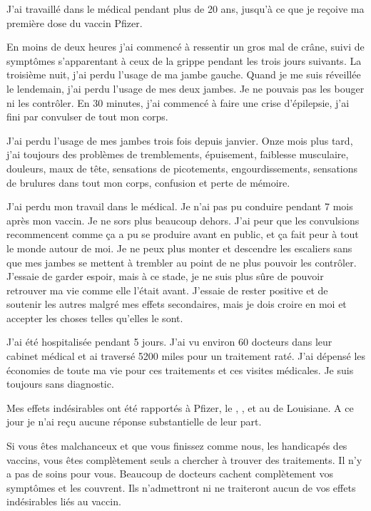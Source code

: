 J'ai travaillé dans le médical pendant plus de 20 ans, jusqu'à ce que je reçoive
ma première dose du vaccin Pfizer.

En moins de deux heures j'ai commencé à ressentir un gros mal de crâne, suivi de
symptômes s'apparentant à ceux de la grippe pendant les trois jours suivants. La
troisième nuit, j'ai perdu l'usage de ma jambe gauche. Quand je me suis
réveillée le lendemain, j'ai perdu l'usage de mes deux jambes. Je ne pouvais pas
les bouger ni les contrôler. En 30 minutes, j'ai commencé à faire une crise
d'épilepsie, j'ai fini par convulser de tout mon corps.

J'ai perdu l'usage de mes jambes trois fois depuis janvier. Onze mois plus tard,
j'ai toujours des problèmes de tremblements, épuisement, faiblesse musculaire,
douleurs, maux de tête, sensations de picotements, engourdissements, sensations
de brulures dans tout mon corps, confusion et perte de mémoire.

J'ai perdu mon travail dans le médical. Je n'ai pas pu conduire pendant 7 mois
après mon vaccin. Je ne sors plus beaucoup dehors. J'ai peur que les convulsions
recommencent comme ça a pu se produire avant en public, et ça fait peur à tout
le monde autour de moi. Je ne peux plus monter et descendre les escaliers sans
que mes jambes se mettent à trembler au point de ne plus pouvoir les
contrôler. J'essaie de garder espoir, mais à ce stade, je ne suis plus sûre de
pouvoir retrouver ma vie comme elle l'était avant. J'essaie de rester positive
et de soutenir les autres malgré mes effets secondaires, mais je dois croire en
moi et accepter les choses telles qu'elles le sont.

J'ai été hospitalisée pendant 5 jours. J'ai vu environ 60 docteurs dans leur
cabinet médical et ai traversé 5200 miles pour un traitement raté. J'ai dépensé
les économies de toute ma vie pour ces traitements et ces visites médicales. Je
suis toujours sans diagnostic.

Mes effets indésirables ont été rapportés à Pfizer, le ,
, et au  de Louisiane. A ce jour je n'ai
reçu aucune réponse substantielle de leur part.

Si vous êtes malchanceux et que vous finissez comme nous, les handicapés des
vaccins, vous êtes complètement seuls a chercher à trouver des traitements. Il
n'y a pas de soins pour vous. Beaucoup de docteurs cachent complètement vos
symptômes et les couvrent. Ils n'admettront ni ne traiteront aucun de vos effets
indésirables liés au vaccin.

